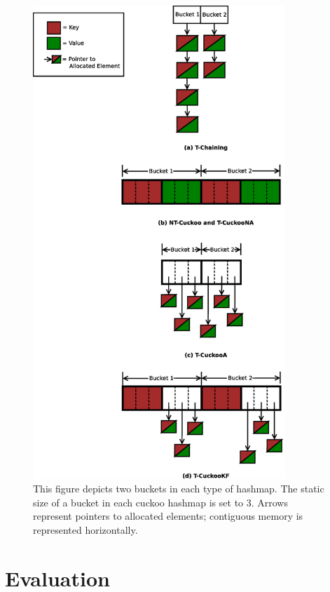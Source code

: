 \begin{figure}[H]
\centering
\includegraphics[width=0.85\textwidth]{hashmap_finds}
    \caption[Bucket Structure of Different Hashmaps]{This figure depicts two buckets in each type of hashmap. The static size of a bucket in each cuckoo hashmap is set to 3. Arrows represent pointers to allocated elements; contiguous memory is represented horizontally.}
\label{fig:hashmap_buckets}
\end{figure}


\section{Evaluation}

